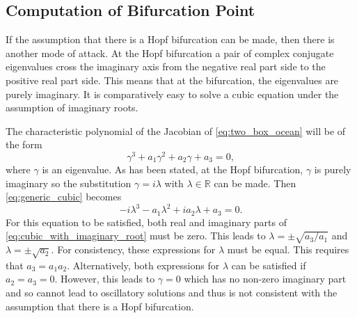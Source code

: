 \subsection{Computation of Bifurcation Point}
If the assumption that there is a Hopf bifurcation can be made, then there is another mode of attack. At the Hopf bifurcation a pair of complex conjugate eigenvalues
cross the imaginary axis from the negative real part side to the positive real part side. This means that at the bifurcation, the eigenvalues are purely imaginary. It is
comparatively easy to solve a cubic equation under the assumption of imaginary roots.

The characteristic polynomial of the Jacobian of \cref{eq:two_box_ocean} will be of the form
\begin{equation}
  \label{eq:generic_cubic}
  \gamma^3 + a_1 \gamma^2 + a_2 \gamma + a_3 = 0,
\end{equation}
where $\gamma$ is an eigenvalue. As has been stated, at the Hopf bifurcation, $\gamma$ is purely imaginary so the substitution $\gamma = i\lambda$ with $\lambda \in \mathbb{R}$
can be made. Then \cref{eq:generic_cubic} becomes
\begin{equation}
  \label{eq:cubic_with_imaginary_root}
  -i\lambda^3 - a_1 \lambda^2 + i a_2 \lambda + a_3 = 0. 
\end{equation}
For this equation to be satisfied, both real and imaginary parts of \cref{eq:cubic_with_imaginary_root} must be zero. This leads to
$\lambda = \pm \sqrt{a_3/a_1}$ and $\lambda = \pm \sqrt{a_2}$. For consistency, these expressions for $\lambda$ must be equal. This requires that $a_3 = a_1a_2$.
Alternatively, both expressions for $\lambda$ can be satisfied if $a_2 = a_3 = 0$. However, this leads to $\gamma = 0$ which has no non-zero imaginary part and so cannot lead to
oscillatory solutions and thus is not consistent with the assumption that there is a Hopf bifurcation.

